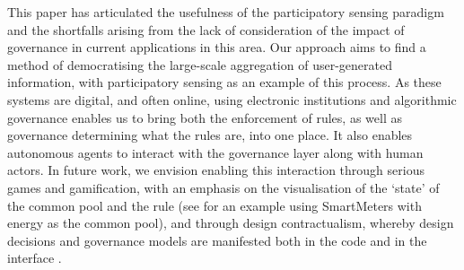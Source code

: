 This paper has articulated the usefulness of the participatory sensing paradigm and the shortfalls arising from the lack of consideration of the impact of governance in current applications in this area. 
Our approach aims to find a method of democratising the large-scale aggregation of user-generated information, with participatory sensing as an example of this process. As these systems are digital, and often online, using electronic institutions and algorithmic governance enables us to bring both the enforcement of rules, as well as governance determining what the rules are, into one place. It also enables autonomous agents to interact with the governance layer along with human actors. In future work, we envision enabling this interaction through
serious games and gamification, with an emphasis on the visualisation of the `state' of the common pool and the rule
(see \citep{Bourazeri12} for an example using SmartMeters with energy as the common pool), and through
design contractualism, whereby design decisions and governance models are manifested both in the code and in the interface
\citep{Pitt12}.





